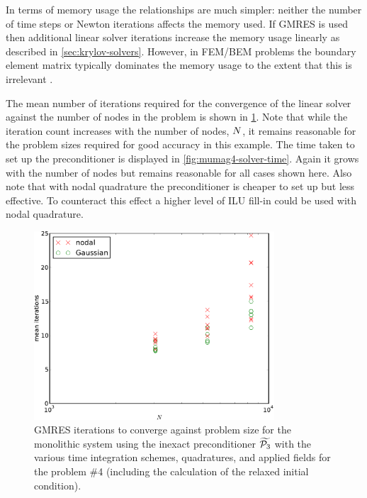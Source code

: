 In terms of memory usage the relationships are much simpler: neither the number of time steps or Newton iterations affects the memory used.
If GMRES is used then additional linear solver iterations increase the memory usage linearly as described in \cref{sec:krylov-solvers}.
However, in FEM/BEM problems the boundary element matrix typically dominates the memory usage to the extent that this is irrelevant \cite{Suess2002}.

The mean number of iterations required for the convergence of the linear solver against the number of nodes in the problem is shown in \cref{fig:mumag4-solver-iterations}.
Note that while the iteration count increases with the number of nodes, $N$, it remains reasonable for the problem sizes required for good accuracy in this example.
The time taken to set up the preconditioner is displayed in \cref{fig:mumag4-solver-time}.
Again it grows with the number of nodes but remains reasonable for all cases shown here.
Also note that with nodal quadrature the preconditioner is cheaper to set up but less effective.
To counteract this effect a higher level of ILU fill-in could be used with nodal quadrature.

\begin{figure}
  \centering
  \includegraphics[width=0.8\textwidth]
  {plots/mumag4_monolithic_its/meanofnsolveritersvsinitialnnode.pdf}
  \caption{
    GMRES iterations to converge against problem size for the monolithic system using the inexact preconditioner $\widetilde{\mathcal{P}_3}$ with the various time integration schemes, quadratures, and applied fields for the \mumag problem \#4 (including the calculation of the relaxed initial condition).
}
  \label{fig:mumag4-solver-iterations}
\end{figure}

